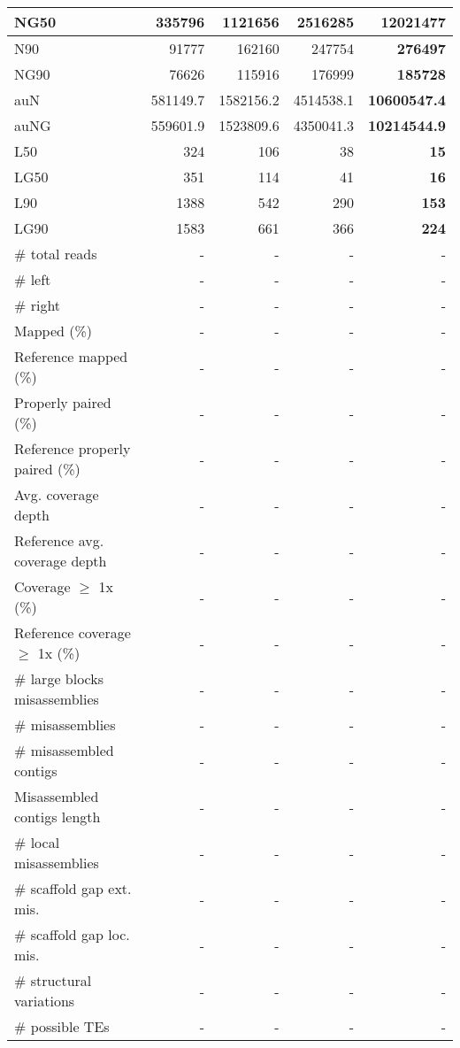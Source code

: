 \documentclass[12pt,a4paper]{article}
\begin{document}
\begin{table}[ht]
\begin{center}
\begin{tabular}{|l*{4}{|r}|}
NG50 & 335796 & 1121656 & 2516285 & {\bf 12021477} \\ \hline
N90 & 91777 & 162160 & 247754 & {\bf 276497} \\ \hline
NG90 & 76626 & 115916 & 176999 & {\bf 185728} \\ \hline
auN & 581149.7 & 1582156.2 & 4514538.1 & {\bf 10600547.4} \\ \hline
auNG & 559601.9 & 1523809.6 & 4350041.3 & {\bf 10214544.9} \\ \hline
L50 & 324 & 106 & 38 & {\bf 15} \\ \hline
LG50 & 351 & 114 & 41 & {\bf 16} \\ \hline
L90 & 1388 & 542 & 290 & {\bf 153} \\ \hline
LG90 & 1583 & 661 & 366 & {\bf 224} \\ \hline
\# total reads & - & - & - & - \\ \hline
\# left & - & - & - & - \\ \hline
\# right & - & - & - & - \\ \hline
Mapped (\%) & - & - & - & - \\ \hline
Reference mapped (\%) & - & - & - & - \\ \hline
Properly paired (\%) & - & - & - & - \\ \hline
Reference properly paired (\%) & - & - & - & - \\ \hline
Avg. coverage depth & - & - & - & - \\ \hline
Reference avg. coverage depth & - & - & - & - \\ \hline
Coverage $\geq$ 1x (\%) & - & - & - & - \\ \hline
Reference coverage $\geq$ 1x (\%) & - & - & - & - \\ \hline
\# large blocks misassemblies & - & - & - & - \\ \hline
\# misassemblies & - & - & - & - \\ \hline
\# misassembled contigs & - & - & - & - \\ \hline
Misassembled contigs length & - & - & - & - \\ \hline
\# local misassemblies & - & - & - & - \\ \hline
\# scaffold gap ext. mis. & - & - & - & - \\ \hline
\# scaffold gap loc. mis. & - & - & - & - \\ \hline
\# structural variations & - & - & - & - \\ \hline
\# possible TEs & - & - & - & - \\ \hline

\end{tabular}
\end{center}
\end{table}
\end{document}
